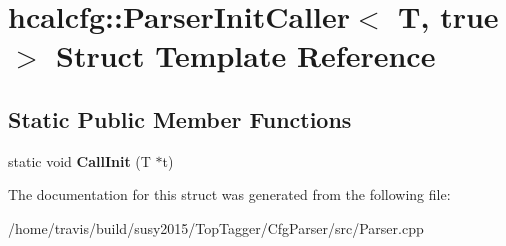 \hypertarget{structhcalcfg_1_1ParserInitCaller_3_01T_00_01true_01_4}{\section{hcalcfg\-:\-:Parser\-Init\-Caller$<$ T, true $>$ Struct Template Reference}
\label{structhcalcfg_1_1ParserInitCaller_3_01T_00_01true_01_4}
}
\subsection*{Static Public Member Functions}
\begin{DoxyCompactItemize}
\item 
\hypertarget{structhcalcfg_1_1ParserInitCaller_3_01T_00_01true_01_4_ab62af8f09bde031e594df3766f45f9da}{static void {\bfseries Call\-Init} (T $\ast$t)}\label{structhcalcfg_1_1ParserInitCaller_3_01T_00_01true_01_4_ab62af8f09bde031e594df3766f45f9da}

\end{DoxyCompactItemize}


The documentation for this struct was generated from the following file\-:\begin{DoxyCompactItemize}
\item 
/home/travis/build/susy2015/\-Top\-Tagger/\-Cfg\-Parser/src/Parser.\-cpp\end{DoxyCompactItemize}
